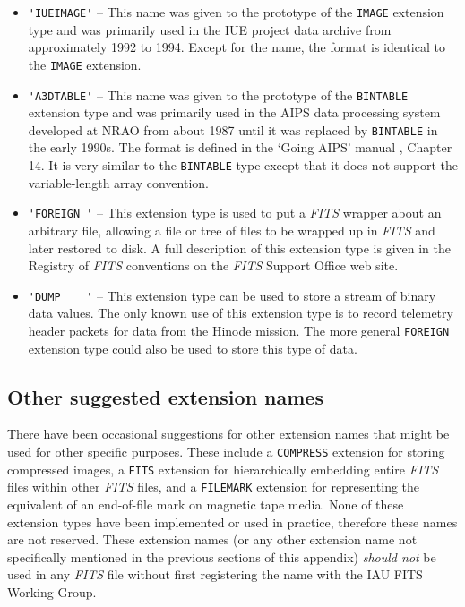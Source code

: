 \documentclass[onecolumn]{aa}
\begin{document}
\begin{itemize}
\item
\verb*+'IUEIMAGE'+ --  
This name was given to the prototype of the {\tt IMAGE} extension type and 
was primarily used in the IUE project data archive from approximately 1992 to 1994. 
Except for the name, the format is identical to the {\tt IMAGE} extension.

\item
\verb*+'A3DTABLE'+ --
This name was given to the prototype of the {\tt BINTABLE}
extension type and was primarily used in the AIPS data processing
system developed at NRAO from about 1987 until it was replaced by 
{\tt BINTABLE} in the early 1990s.  
The format is defined in the `Going AIPS' manual \citep{cotton90}, Chapter 14.
It  is very similar to the {\tt BINTABLE} type except that it does not support the
variable-length array convention.

\item
\verb*+'FOREIGN '+ --
 This extension type is used to put a {\em FITS\/} wrapper about an 
arbitrary file, allowing a file or tree of files to be wrapped up in {\em FITS\/} 
and later restored to disk.  A full description of this extension type
is given in the  Registry of {\em FITS\/} conventions on the {\em FITS\/} Support Office web site.

\item
\verb*+'DUMP    '+ -- 
This extension type  can be used to store a stream of binary data values. The only known use
of this extension type is to record telemetry header packets for data from the Hinode mission.
The more general {\tt FOREIGN} extension type could also be used to store this type of data.
\end{itemize}

\subsection{Other suggested extension names}

There have been occasional suggestions for other extension names that might be used
for other specific purposes.  These include a {\tt COMPRESS} extension for storing
compressed images,  a {\tt FITS} extension for hierarchically embedding entire {\em FITS}
files within other {\em FITS} files, and a {\tt FILEMARK} extension for representing
the equivalent of an end-of-file mark on magnetic tape media.  None of these extension types
have been implemented or used in practice, therefore these names are not reserved.
These extension names (or any other extension name not specifically mentioned 
in the previous sections of this appendix) {\em should
not} be used in any {\em FITS\/} file without first registering the name with the IAU FITS Working Group.
\end{document}
